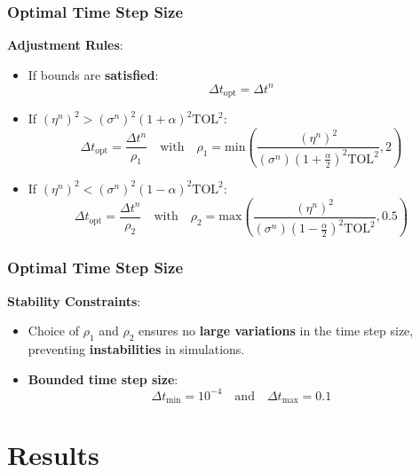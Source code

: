 \documentclass{settings/laserbeam}
\begin{document}
\begin{frame}
    
    \frametitle{Optimal Time Step Size}

    \begin{cbox}
    \textbf{Adjustment Rules}:
    \begin{itemize}
        \item If bounds are \textbf{satisfied}:
        $$
        \Delta t_{\text{opt}} = \Delta t^n
        $$
        \item If $(\eta^n)^2 > (\sigma^n)^2(1+\alpha)^2\text{TOL}^2$:
        $$
        \Delta t_{\text{opt}} = \frac{\Delta t^n}{\rho_1}\quad\text{with}\quad\rho_1 =  \text{min}\left(\frac{(\eta^n)^2}{(\sigma^n)(1+\frac{\alpha}{2})^2\text{TOL}^2},2\right)
        $$
        \item If $(\eta^n)^2 < (\sigma^n)^2(1-\alpha)^2\text{TOL}^2$:
        $$
        \Delta t_{\text{opt}} = \frac{\Delta t^n}{\rho_2}\quad\text{with}\quad\rho_2 =  \text{max}\left(\frac{(\eta^n)^2}{(\sigma^n)(1-\frac{\alpha}{2})^2\text{TOL}^2},0.5\right)
        $$
        \end{itemize}
    \end{cbox}
\end{frame}

\begin{frame}
    
    \frametitle{Optimal Time Step Size}

    \begin{info}
        \textbf{Stability Constraints}:
        \begin{itemize}
            \item Choice of $\rho_1$ and $\rho_2$ ensures no \textbf{large variations} in the time step size, preventing \textbf{instabilities} in simulations.
            \item \textbf{Bounded time step size}:
            $$
            \Delta t_{\text{min}}=10^{-4}\quad\text{and}\quad\Delta t_{\text{max}}=0.1
            $$
            \end{itemize}
    \end{info}
\end{frame}

\section{Results}

\begin{frame}
	\begin{cbox}
		{\fontsize{20pt}{7.2}\selectfont {}}
	\end{cbox}
\end{frame}
\end{document}
